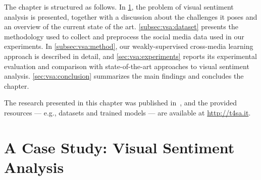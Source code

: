 The chapter is structured as follows.
In \ref{sec:vsa:introduction}, the problem of visual sentiment analysis is presented, together with a discussion about the challenges it poses and an overview of the current state of the art.
\ref{subsec:vsa:dataset} presents the methodology used to collect and preprocess the social media data used in our experiments.
In \ref{subsec:vsa:method}, our weakly-supervised cross-media learning approach is described in detail, and \ref{sec:vsa:experiments} reports its experimental evaluation and comparison with state-of-the-art approaches to visual sentiment analysis.
\ref{sec:vsa:conclusion} summarizes the main findings and concludes the chapter.

The research presented in this chapter was published in~\cite{vadicamo2017cross}, and the provided resources --- e.g., datasets and trained models --- are available at \url{http://t4sa.it}.



\section{A Case Study: Visual Sentiment Analysis}
\label{sec:vsa:introduction}

